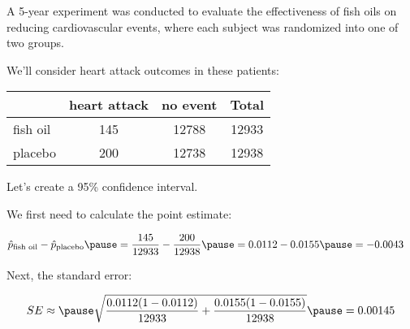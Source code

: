 \documentclass{beamer}
\begin{document}
\begin{frame}
  \begin{example}
    A 5-year experiment was conducted to evaluate the effectiveness of fish oils on reducing cardiovascular events, where each subject was randomized into one of two groups.

    \vspace{1mm}
    We'll consider heart attack outcomes in these patients:
    \begin{center}
      \begin{tabular}{lccc}\hline
        & heart attack & no event & Total \\\hline
        fish oil & 145 & 12788 & 12933 \\
        placebo & 200 & 12738 & 12938 \\\hline
      \end{tabular}
    \end{center}\pause

    Let's create a 95\% confidence interval.\pause

    \vspace{1mm}
    We first need to calculate the point estimate:

    \vspace{-6mm}
    \begin{equation*}
      \begin{aligned}
        \hat{p}_{\text{fish oil}} - \hat{p}_{\text{placebo}}\pause
        &= \dfrac{145}{12933} - \dfrac{200}{12938}\pause
        = 0.0112 - 0.0155\pause
        = -0.0043
      \end{aligned}
    \end{equation*}\pause

    \vspace{-4mm}
    Next, the standard error:

    \vspace{-6mm}
    \begin{equation*}
      \begin{aligned}
        SE \approx \pause \sqrt{\dfrac{0.0112(1-0.0112)}{12933}+\dfrac{0.0155(1-0.0155)}{12938}}\pause
        =0.00145
      \end{aligned}
    \end{equation*}
  \end{example}
\end{frame}
\end{document}
